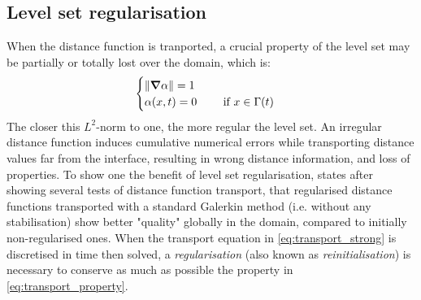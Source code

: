 \subsection{Level set regularisation}
%
When the distance function is tranported, a crucial property of the level set may be partially or totally 
lost over the domain, which is:
\begin{align}
\label{eq:transport_property}
\begin{cases}
\lVert \boldsymbol{\nabla} \alpha \rVert = 1 \\ 
\alpha (x,t) = 0 	\qquad  \text{ if } x \in \Gamma(t)
\end{cases}
\end{align}
The closer this $L^2$-norm to one, the more regular the level set. An irregular distance function induces 
cumulative numerical errors while transporting distance values far from the interface,
resulting in wrong distance information, and loss of properties. 
To show one the benefit of level set regularisation, \citet{basset_simulation_2006} states 
after showing several tests of distance function transport, that
regularised distance functions transported with a standard Galerkin method (i.e. without any stabilisation) 
show better "quality" globally in the domain, compared to initially non-regularised ones.
When the transport equation in \cref{eq:transport_strong} is discretised in time then solved, a \emph{regularisation} 
(also known as \emph{reinitialisation}) is necessary to conserve as much as 
possible the property in \cref{eq:transport_property}.

